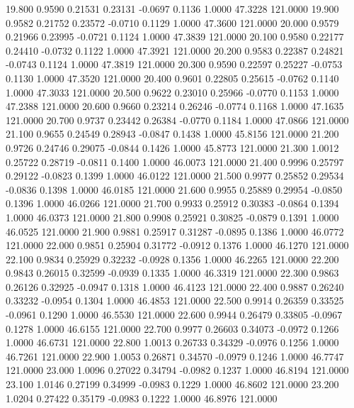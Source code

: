   19.800   0.9590   0.21531   0.23131  -0.0697   0.1136   1.0000  47.3228 121.0000
  19.900   0.9582   0.21752   0.23572  -0.0710   0.1129   1.0000  47.3600 121.0000
  20.000   0.9579   0.21966   0.23995  -0.0721   0.1124   1.0000  47.3839 121.0000
  20.100   0.9580   0.22177   0.24410  -0.0732   0.1122   1.0000  47.3921 121.0000
  20.200   0.9583   0.22387   0.24821  -0.0743   0.1124   1.0000  47.3819 121.0000
  20.300   0.9590   0.22597   0.25227  -0.0753   0.1130   1.0000  47.3520 121.0000
  20.400   0.9601   0.22805   0.25615  -0.0762   0.1140   1.0000  47.3033 121.0000
  20.500   0.9622   0.23010   0.25966  -0.0770   0.1153   1.0000  47.2388 121.0000
  20.600   0.9660   0.23214   0.26246  -0.0774   0.1168   1.0000  47.1635 121.0000
  20.700   0.9737   0.23442   0.26384  -0.0770   0.1184   1.0000  47.0866 121.0000
  21.100   0.9655   0.24549   0.28943  -0.0847   0.1438   1.0000  45.8156 121.0000
  21.200   0.9726   0.24746   0.29075  -0.0844   0.1426   1.0000  45.8773 121.0000
  21.300   1.0012   0.25722   0.28719  -0.0811   0.1400   1.0000  46.0073 121.0000
  21.400   0.9996   0.25797   0.29122  -0.0823   0.1399   1.0000  46.0122 121.0000
  21.500   0.9977   0.25852   0.29534  -0.0836   0.1398   1.0000  46.0185 121.0000
  21.600   0.9955   0.25889   0.29954  -0.0850   0.1396   1.0000  46.0266 121.0000
  21.700   0.9933   0.25912   0.30383  -0.0864   0.1394   1.0000  46.0373 121.0000
  21.800   0.9908   0.25921   0.30825  -0.0879   0.1391   1.0000  46.0525 121.0000
  21.900   0.9881   0.25917   0.31287  -0.0895   0.1386   1.0000  46.0772 121.0000
  22.000   0.9851   0.25904   0.31772  -0.0912   0.1376   1.0000  46.1270 121.0000
  22.100   0.9834   0.25929   0.32232  -0.0928   0.1356   1.0000  46.2265 121.0000
  22.200   0.9843   0.26015   0.32599  -0.0939   0.1335   1.0000  46.3319 121.0000
  22.300   0.9863   0.26126   0.32925  -0.0947   0.1318   1.0000  46.4123 121.0000
  22.400   0.9887   0.26240   0.33232  -0.0954   0.1304   1.0000  46.4853 121.0000
  22.500   0.9914   0.26359   0.33525  -0.0961   0.1290   1.0000  46.5530 121.0000
  22.600   0.9944   0.26479   0.33805  -0.0967   0.1278   1.0000  46.6155 121.0000
  22.700   0.9977   0.26603   0.34073  -0.0972   0.1266   1.0000  46.6731 121.0000
  22.800   1.0013   0.26733   0.34329  -0.0976   0.1256   1.0000  46.7261 121.0000
  22.900   1.0053   0.26871   0.34570  -0.0979   0.1246   1.0000  46.7747 121.0000
  23.000   1.0096   0.27022   0.34794  -0.0982   0.1237   1.0000  46.8194 121.0000
  23.100   1.0146   0.27199   0.34999  -0.0983   0.1229   1.0000  46.8602 121.0000
  23.200   1.0204   0.27422   0.35179  -0.0983   0.1222   1.0000  46.8976 121.0000
